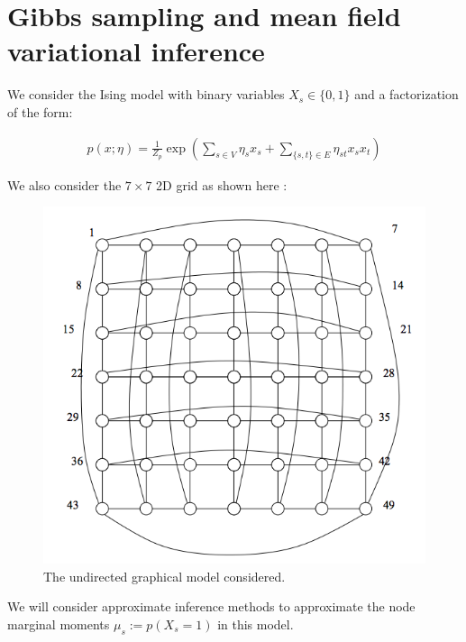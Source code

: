 \documentclass[11pt]{article}
\begin{document}

\section{Gibbs sampling and mean field variational inference}\label{sec:num2}

We consider the Ising model with binary variables $X_s \in \{0,1\}$ and a factorization of the form:

\begin{align}\label{eq:dist_p}
p(x;\eta) = \frac{1}{Z_p} \exp \left( \sum_{s \in V} \eta_s x_s + \sum_{\{s,t\} \in E} \eta_{st} x_s x_t \right)
\end{align}

We also consider the $7 \times 7$ 2D grid as shown here :

\begin{figure}[htbp]
\begin{center}
\includegraphics[scale=0.6]{figures/ising_grid.png}
\caption{The undirected graphical model considered.}
\label{fig:ising}
\end{center}
\end{figure}

We will consider approximate inference methods to approximate the node marginal moments $\mu_s := p(X_s = 1)$ in this model.
\end{document}
